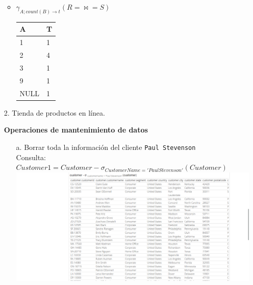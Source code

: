\documentclass[12pt,a4paper]{article}
\begin{document}
\begin{enumerate}
\begin{itemize}
			\item $\gamma_{A ; count(B) \rightarrow t} (R =\bowtie= S)$\\
				\begin{tabular}{|l|l|}
					\hline
					A		&T\\
					\hline
					1		&1\\
					2		&4\\
					3		&1\\
					9		&1\\
					NULL	&1\\
					\hline
				\end{tabular}

		\end{itemize}


	\pagebreak
	\item[2.] Tienda de productos en línea.

		\textbf{Operaciones de mantenimiento de datos}\\
		\begin{enumerate}
			\item [a.] Borrar toda la información del cliente \texttt{Paul Stevenson}\\
				Consulta: $Customer1 = Customer - \sigma_{CustomerName='Paul Stevenson'}(Customer)$\\

				\includegraphics[scale=0.4]{assets/mantenimiento_datos-a.png}


\end{enumerate}
\end{enumerate}
\end{document}
